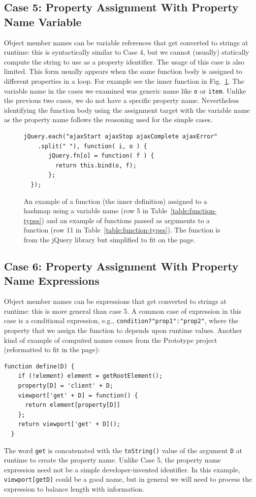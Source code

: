 \documentclass[10pt, preprint]{sigplanconf}
\begin{document}
\subsection{Case 5: Property Assignment With  Property Name Variable}
Object member names can be variable references that get converted to strings at runtime: this is syntactically similar to Case 4, but we cannot (usually) statically compute the string to use as a property identifier.
The usage of this case is also limited. This form usually appears when the same function body is assigned to different properties in a loop. 
For example see the inner function in Fig.~\ref{fig:jQueryEach}. The variable
 name in the cases we examined was generic name like \verb|o| or \verb|item|. Unlike the previous two cases, we
do not have a specific property name.  Nevertheless identifying the function body using the assignment target with the variable name as the property name follows the reasoning used for the simple cases.
\begin{figure}[htp]
\lstset{basicstyle=\scriptsize}
\begin{lstlisting}[frame=single, language=myLang]
  jQuery.each("ajaxStart ajaxStop ajaxComplete ajaxError"
    .split(" "), function( i, o ) {
       jQuery.fn[o] = function( f ) {
         return this.bind(o, f);
       };
  });
\end{lstlisting}
\caption{An example of a function (the inner definition) assigned to a hashmap using a variable name (row 5 in Table~\ref{table:function-types}) and an example of 
functions passed as arguments to a function (row 11 in Table~\ref{table:function-types}). The function is from the jQuery library but simplified to fit on the page. }
\label{fig:jQueryEach}
\end{figure}

\subsection{Case 6:  Property Assignment With  Property Name Expressions}
\label{sec:propexpressions}
Object member names can be expressions that get converted to strings at runtime: this is more general than case 5. 
 A common case of expression in this case is a conditional expression, e.g., \verb|condition?"prop1":"prop2"|, where the property that we assign the function to depends upon runtime values. Another kind of example of computed names comes from the Prototype project (reformatted to fit in the page):
\lstset{basicstyle=\scriptsize}
\begin{lstlisting}[frame=single, language=myLang]
  function define(D) {
    if (!element) element = getRootElement();
    property[D] = 'client' + D;
    viewport['get' + D] = function() { 
      return element[property[D]] 
    };
    return viewport['get' + D]();
  }
\end{lstlisting}
The word \verb|get| is concatenated with the \verb|toString()| value of the argument \verb|D| at runtime to create the property name.  Unlike Case 5, the property name expression need not be a simple developer-invented identifier. In this example, \verb|viewport[getD]| could be a good name, but in general we will need to process the expression to balance length with information.
\end{document}
